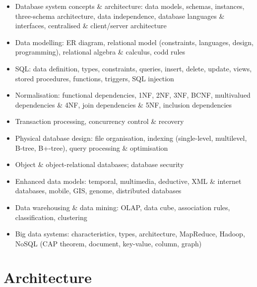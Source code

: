 

\begin{sylbox}

\begin{itemize}
\tightlist
\item[$\square$]
  Database system concepts \& architecture: data models, schemas, instances, three-schema architecture, data independence, database languages \& interfaces, centralised \& client/server architecture
\item[$\square$]
  Data modelling: ER diagram, relational model (constraints, languages, design, programming), relational algebra \& calculus, codd rules
\item[$\square$]
  SQL: data definition, types, constraints, queries, insert, delete, update, views, stored procedures, functions, triggers, SQL injection
\item[$\square$]
  Normalisation: functional dependencies, 1NF, 2NF, 3NF, BCNF, multivalued dependencies \& 4NF, join dependencies \& 5NF, inclusion dependencies
\item[$\square$]
  Transaction processing, concurrency control \& recovery
\item[$\square$]
  Physical database design: file organisation, indexing (single-level, multilevel, B-tree, B+-tree), query processing \& optimisation
\item[$\square$]
  Object \& object-relational databases; database security
\item[$\square$]
  Enhanced data models: temporal, multimedia, deductive, XML \& internet databases, mobile, GIS, genome, distributed databases
\item[$\square$]
  Data warehousing \& data mining: OLAP, data cube, association rules, classification, clustering
\item[$\square$]
  Big data systems: characteristics, types, architecture, MapReduce, Hadoop, NoSQL (CAP theorem, document, key-value, column, graph)
\end{itemize}

\end{sylbox}

\needspace{161pt}

\hypertarget{p2-04--1-architecture}{%
\section{Architecture}\label{p2-04--1-architecture}}

